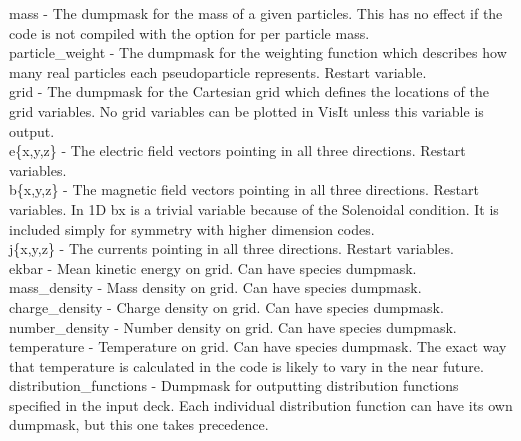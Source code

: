 {\emphtext mass} - The dumpmask for the mass of a given particles. This
has no effect if the code is not compiled with the option for per
particle mass.\\

{\emphtext particle\_weight} - The dumpmask for the weighting function which
describes how many real particles each pseudoparticle represents. Restart
variable.\\

{\emphtext grid} - The dumpmask for the Cartesian grid which defines the
locations of the grid variables. No grid variables can be plotted in VisIt
unless this variable is output.\\

{\emphtext e\{x,y,z\}} - The electric field vectors pointing in all three
directions. Restart variables.\\

{\emphtext b\{x,y,z\}} - The magnetic field vectors pointing in all three
directions. Restart variables. In 1D bx is a trivial variable because of the
Solenoidal condition. It is included simply for symmetry with higher dimension
codes.\\

{\emphtext j\{x,y,z\}} - The currents pointing in all three directions. Restart
variables.\\

{\emphtext ekbar} - Mean kinetic energy on grid. Can have species dumpmask.\\

{\emphtext mass\_density} - Mass density on grid. Can have species dumpmask.\\

{\emphtext charge\_density} - Charge density on grid. Can have species
dumpmask.\\

{\emphtext number\_density} - Number density on grid. Can have species
dumpmask.\\

{\emphtext temperature} - Temperature on grid. Can have species dumpmask. The
exact way that temperature is calculated in the code is likely to vary in the
near future.\\

{\emphtext distribution\_functions} - Dumpmask for outputting distribution
functions specified in the input deck. Each individual distribution function
can have its own dumpmask, but this one takes precedence.\\

